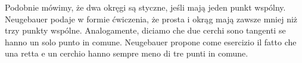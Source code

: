 Podobnie mówimy, że dwa okręgi są styczne, jeśli mają jeden punkt wspólny. %
Neugebauer \cite[s. 20]{neugebauer_2018} podaje w formie ćwiczenia, że prosta i okrąg mają zawsze mniej niż trzy punkty wspólne. %
Analogamente, diciamo che due cerchi sono tangenti se hanno un solo punto in comune. %
Neugebauer \cite[p. 20]{neugebauer_2018} propone come esercizio il fatto che una retta e un cerchio hanno sempre meno di tre punti in comune. %

%